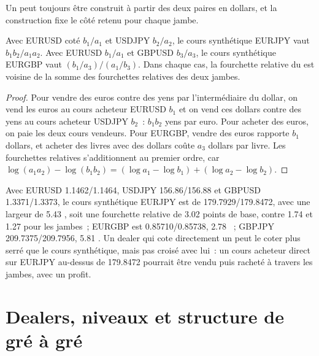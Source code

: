 Un  peut toujours être construit à partir des deux paires en dollars, et la
construction fixe le côté retenu pour chaque jambe.

\begin{proposition}\label{prop:m2:the-fx-market:cross}
Avec EURUSD coté $b_1/a_1$ et USDJPY $b_2/a_2$, le cours synthétique EURJPY vaut
$b_1b_2 / a_1a_2$. Avec EURUSD $b_1/a_1$ et GBPUSD $b_3/a_3$, le cours synthétique
EURGBP vaut $(b_1/a_3)/(a_1/b_3)$. Dans chaque cas, la fourchette relative du  est voisine de la somme des fourchettes relatives des deux jambes.
\end{proposition}

\begin{proof}
Pour vendre des euros contre des yens par l'intermédiaire du dollar, on vend les euros au cours acheteur EURUSD $b_1$ et
on vend ces dollars contre des yens au cours acheteur USDJPY $b_2$~: $b_1b_2$ yens par euro. Pour acheter
des euros, on paie les deux cours vendeurs. Pour EURGBP, vendre des euros rapporte $b_1$ dollars, et
acheter des livres avec des dollars coûte $a_3$ dollars par livre. Les fourchettes relatives s'additionnent
au premier ordre, car $\log(a_1a_2) - \log(b_1b_2) = (\log a_1 - \log b_1) +
(\log a_2 - \log b_2)$.
\end{proof}

\begin{example}\label{ex:m2:the-fx-market:crosses}
Avec EURUSD 1.1462/1.1464, USDJPY 156.86/156.88 et GBPUSD 1.3371/1.3373, le
cours synthétique EURJPY est de 179.7929/179.8472, avec une largeur de 5.43 , soit une fourchette relative de
3.02 points de base, contre 1.74 et 1.27 pour les jambes~; EURGBP est
0.85710/0.85738, 2.78 ~; GBPJPY 209.7375/209.7956, 5.81 . Un dealer qui
cote directement un  peut le coter plus serré que le cours synthétique, mais pas
croisé avec lui~: un cours acheteur direct sur EURJPY au-dessus de 179.8472 pourrait être vendu
puis racheté à travers les jambes, avec un profit.
\end{example}

\section{Dealers, niveaux et structure de gré à gré}

